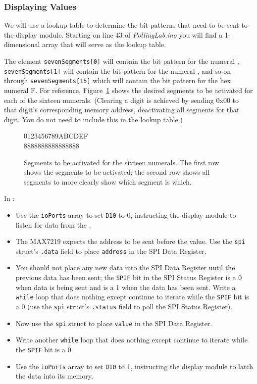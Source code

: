 \subsubsection{Displaying Values}

We will use a lookup table to determine the bit patterns that need to be sent
to the display module. Starting on line 43 of \textit{PollingLab.ino} you will
find a 1-dimensional array that will serve as the lookup table.

The element \lstinline{sevenSegments[0]} will contain the bit pattern for the
numeral {},  \lstinline{sevenSegments[1]} will contain the bit
pattern for the numeral {}, and so on through
\lstinline{sevenSegments[15]} which will contain the bit pattern for the hex
numeral {\dviiseg F}. For reference, Figure~\ref{fig:SevenSegmentNumerals}
shows the desired segments to be activated for each of the sixteen numerals.
(Clearing a digit is achieved by sending 0x00 to that digit's corresponding
memory address, deactivating all segments for that digit. You do not need to
include this in the lookup table.)

\begin{figure}
    \centering
    {\dviiseg \huge 0123456789ABCDEF \\ \vspace{0.1cm}
                   8888888888888888}
    \caption{Segments to be activated for the sixteen numerals. The first row shows the segments to be activated; the second row shows all segments to more clearly show which segment is which. \label{fig:SevenSegmentNumerals}}
\end{figure}

In :
    \begin{itemize}
    \item Use the \lstinline{ioPorts} array to set \texttt{D10} to 0, instructing the display module to listen for data from the \nano.
    \item The MAX7219 expects the address to be sent before the value. Use the
        \lstinline{spi} struct's \lstinline{.data} field to place
        \lstinline{address} in the SPI Data Register.
    \item You should not place any new data into the SPI Data Register until
        the previous data has been sent; the \texttt{SPIF} bit in the SPI
        Status Register is a 0 when data is being sent and is a 1 when the data
        has been sent. Write a \lstinline{while} loop that does nothing except
        continue to iterate while the \texttt{SPIF} bit is a 0 (use the
        \lstinline{spi} struct's \lstinline{.status} field to poll the SPI
        Status Register).
    \item Now use the \lstinline{spi} struct to place \lstinline{value} in the
        SPI Data Register.
    \item Write another \lstinline{while} loop that does nothing except
        continue to iterate while the \texttt{SPIF} bit is a 0.
    \item Use the \lstinline{ioPorts} array to set \texttt{D10} to 1,
        instructing the display module to latch the data into its memory.
    \end{itemize}

